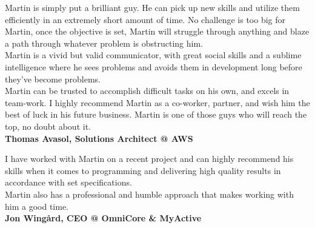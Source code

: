 \documentclass[9pt]{template} %
\begin{document}


\begin{minipage}[t]{\textwidth} %
  \vspace{-\baselineskip}

  Martin is simply put a brilliant guy. He can pick up new skills and utilize them efficiently in an extremely short amount of time. No challenge is too big for Martin, once the objective is set, Martin will struggle through anything and blaze a path through whatever problem is obstructing him.\\

  Martin is a vivid but valid communicator, with great social skills and a sublime intelligence where he sees problems and avoids them in development long before they’ve become problems.\\

  Martin can be trusted to accomplish difficult tasks on his own, and excels in team-work. I highly recommend Martin as a co-worker, partner, and wish him the best of luck in his future business. Martin is one of those guys who will reach the top, no doubt about it.\\

  \textbf{Thomas Avasol, Solutions Architect @ AWS}
\end{minipage}

\vspace{20pt}

\begin{minipage}[t]{\textwidth} %
  \vspace{-\baselineskip}

  I have worked with Martin on a recent project and can highly recommend his skills when it comes to programming and delivering high quality results in accordance with set specifications.\\

  Martin also has a professional and humble approach that makes working with him a good time.\\

  \textbf{Jon Wingård, CEO @ OmniCore \& MyActive}
\end{minipage}


\end{document}

